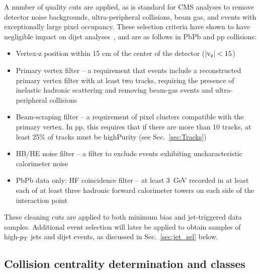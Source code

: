 A number of quality cuts are applied, as is standard for CMS analyses to remove detector noise backgrounds, ultra-peripheral collisions, beam gas, and events with exceptionally large pixel occupancy. These selection criteria have shown to have negligible impact on dijet analyses~\cite{Chatrchyan:2012gt,Chatrchyan:2012gw}, and are as follows in PbPb and pp collisions: 
\begin{itemize}
\item Vertex-z position within 15 cm of the center of the detector ($|\rm v_{z}| < 15$)
\item Primary vertex filter -- a requirement that events include a reconstructed primary vertex filter with at least two tracks, requiring the presence of inelastic hadronic scattering and removing beam-gas events and ultra-peripheral collisions
\item Beam-scraping filter -- a requirement of pixel clusters compatible with the primary vertex.  In pp, this requires that if there are more than 10 tracks, at least 25\% of tracks must be highPurity (see Sec.~\ref{sec:Tracks})
\item HB/HE noise filter -- a filter to exclude events exhibiting uncharacteristic calorimeter noise~\cite{Chatrchyan:2009hy}
\item PbPb data only:  HF coincidence filter -- at least 3~GeV recorded in at least each of at least three hadronic forward calorimeter towers on each side of the interaction point
\end{itemize}

\noindent These cleaning cuts are applied to both minimum bias and jet-triggered data samples.  Additional event selection will later be applied to obtain samples of high-$p_{\rm T}$ jets and dijet events, as discussed in Sec.~\ref{sec:jet_sel} below. 



\subsection{Collision centrality determination and classes}
\label{sec:centrality}

